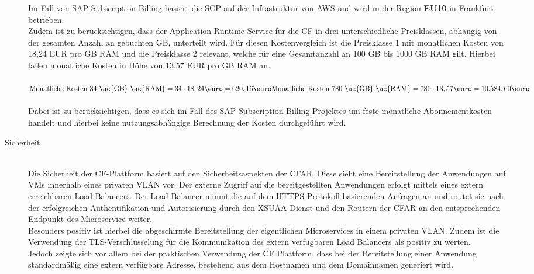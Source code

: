 \begin{description}
	Im Fall von SAP Subscription Billing basiert die \ac{SCP} auf der Infrastruktur von \ac{AWS} und wird in der Region \textbf{EU10} in Frankfurt betrieben. \\
	Zudem ist zu berücksichtigen, dass der Application Runtime-Service für die \ac{CF} in drei unterschiedliche Preisklassen, abhängig von der gesamten Anzahl an gebuchten \ac{GB}, unterteilt wird. Für diesen Kostenvergleich ist die Preisklasse 1 mit monatlichen Kosten von 18,24 EUR pro \ac{GB} \ac{RAM} und die Preisklasse 2 relevant, welche für eine Gesamtanzahl an 100 \ac{GB} bis 1000 \ac{GB} \ac{RAM} gilt. Hierbei fallen monatliche Kosten in Höhe von 13,57 EUR pro \ac{GB} \ac{RAM} an.\\
	\\
	$\textrm{Monatliche Kosten 34 \ac{GB} \ac{RAM}} = 34 \cdot 18,24 \textrm{\euro} = 620,16 \textrm{\euro}\\
		\textrm{Monatliche Kosten 780 \ac{GB} \ac{RAM}} = 780 \cdot 13,57 \textrm{\euro} = 10.584,60 \textrm{\euro}$
	\\
	\\
	Dabei ist zu berücksichtigen, dass es sich im Fall des SAP Subscription Billing Projektes um feste monatliche Abonnementkosten handelt und hierbei keine nutzungsabhängige Berechnung der Kosten durchgeführt wird.
	\item[Sicherheit] \hfill \\
	Die Sicherheit der \ac{CF}-Plattform basiert auf den Sicherheitsaspekten der \ac{CFAR}. Diese sieht eine Bereitstellung der Anwendungen auf \acsp{VM} innerhalb eines privaten \ac{VLAN} vor. Der externe Zugriff auf die bereitgestellten Anwendungen erfolgt mittels eines extern erreichbaren Load Balancers.
	Der Load Balancer nimmt die auf dem \ac{HTTPS}-Protokoll basierenden Anfragen an und routet sie nach der erfolgreichen Authentifikation und Autorisierung durch den \ac{XSUAA}-Dienst und den Routern der \ac{CFAR} an den entsprechenden Endpunkt des Microservice weiter.\\
	Besonders positiv ist hierbei die abgeschirmte Bereitstellung der eigentlichen Microservices in einem privaten \ac{VLAN}. Zudem ist die Verwendung der \ac{TLS}-Verschlüsselung für die Kommunikation des extern verfügbaren Load Balancers als positiv zu werten.\autocite[Vgl.][System Boundaries and Access]{CloudFoundryFoundation.20191217}\\
	Jedoch zeigte sich vor allem bei der praktischen Verwendung der \ac{CF} Plattform, dass bei der Bereitstellung einer Anwendung standardmäßig eine extern verfügbare Adresse, bestehend aus dem Hostnamen und dem Domainnamen generiert wird. 

\end{description}
